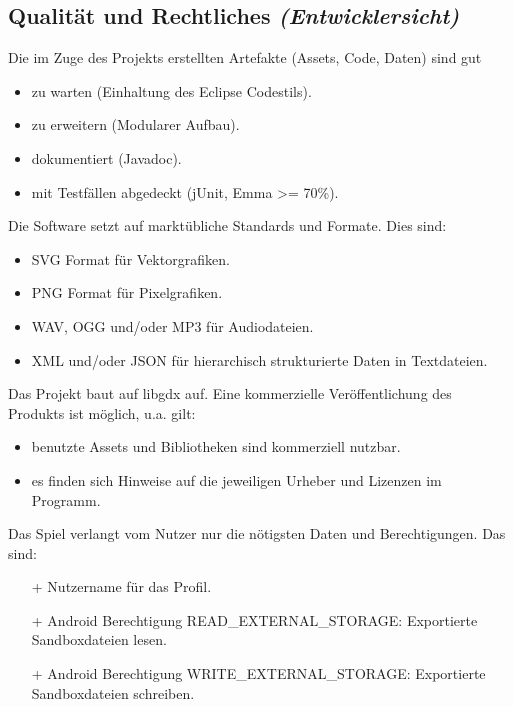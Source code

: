 \subsection{Qualität und Rechtliches \textit{(Entwicklersicht)}}
\begin{requirements}
	 Die im Zuge des Projekts erstellten Artefakte (Assets, Code, Daten) sind gut
		\begin{itemize}
			\item zu warten (Einhaltung des Eclipse Codestils).
			\item zu erweitern (Modularer Aufbau).
			\item dokumentiert (Javadoc).
			\item mit Testfällen abgedeckt (jUnit, Emma >= 70\%).
		\end{itemize}
	 Die Software setzt auf marktübliche Standards und Formate. Dies sind:
		\begin{itemize}
			\item SVG Format für Vektorgrafiken.
			\item PNG Format für Pixelgrafiken.
			\item WAV, OGG und/oder MP3 für Audiodateien.
			\item XML und/oder JSON für hierarchisch strukturierte Daten in Textdateien.
		\end{itemize}
	 Das Projekt baut auf libgdx auf.
	 Eine kommerzielle Veröffentlichung des Produkts ist möglich, u.a. gilt:
		\begin{itemize}
			\item benutzte Assets und Bibliotheken sind kommerziell nutzbar.
			\item es finden sich Hinweise auf die jeweiligen Urheber und Lizenzen im Programm.
		\end{itemize}
	 Das Spiel verlangt vom Nutzer nur die nötigsten Daten und Berechtigungen. Das sind:
		\begin{itemize}
			\item [+] Nutzername für das Profil.
			\item [+] Android Berechtigung READ\_EXTERNAL\_STORAGE: Exportierte Sandboxdateien lesen.
			\item [+] Android Berechtigung WRITE\_EXTERNAL\_STORAGE: Exportierte Sandboxdateien schreiben.
		\end{itemize}
\end{requirements}
